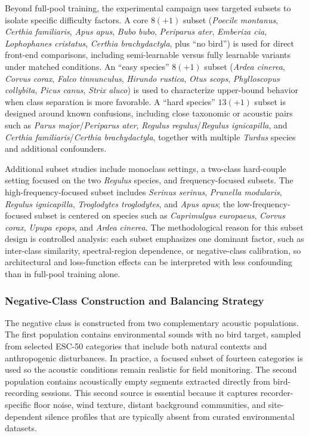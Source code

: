 \documentclass[a4paper,singleside,12pt]{report} %
\begin{document}
	Beyond full-pool training, the experimental campaign uses targeted subsets to isolate specific difficulty factors. A core \(8(+1)\) subset (\emph{Poecile montanus}, \emph{Certhia familiaris}, \emph{Apus apus}, \emph{Bubo bubo}, \emph{Periparus ater}, \emph{Emberiza cia}, \emph{Lophophanes cristatus}, \emph{Certhia brachydactyla}, plus ``no bird'') is used for direct front-end comparisons, including semi-learnable versus fully learnable variants under matched conditions. An ``easy species'' \(8(+1)\) subset (\emph{Ardea cinerea}, \emph{Corvus corax}, \emph{Falco tinnunculus}, \emph{Hirundo rustica}, \emph{Otus scops}, \emph{Phylloscopus collybita}, \emph{Picus canus}, \emph{Strix aluco}) is used to characterize upper-bound behavior when class separation is more favorable. A ``hard species'' \(13(+1)\) subset is designed around known confusions, including close taxonomic or acoustic pairs such as \emph{Parus major}/\emph{Periparus ater}, \emph{Regulus regulus}/\emph{Regulus ignicapilla}, and \emph{Certhia familiaris}/\emph{Certhia brachydactyla}, together with multiple \emph{Turdus} species and additional confounders.

	Additional subset studies include monoclass settings, a two-class hard-couple setting focused on the two \emph{Regulus} species, and frequency-focused subsets. The high-frequency-focused subset includes \emph{Serinus serinus}, \emph{Prunella modularis}, \emph{Regulus ignicapilla}, \emph{Troglodytes troglodytes}, and \emph{Apus apus}; the low-frequency-focused subset is centered on species such as \emph{Caprimulgus europaeus}, \emph{Corvus corax}, \emph{Upupa epops}, and \emph{Ardea cinerea}. The methodological reason for this subset design is controlled analysis: each subset emphasizes one dominant factor, such as inter-class similarity, spectral-region dependence, or negative-class calibration, so architectural and loss-function effects can be interpreted with less confounding than in full-pool training alone.

	\subsubsection{Negative-Class Construction and Balancing Strategy}
	The negative class is constructed from two complementary acoustic populations. The first population contains environmental sounds with no bird target, sampled from selected ESC-50 categories that include both natural contexts and anthropogenic disturbances. In practice, a focused subset of fourteen categories is used so the acoustic conditions remain realistic for field monitoring. The second population contains acoustically empty segments extracted directly from bird-recording sessions. This second source is essential because it captures recorder-specific floor noise, wind texture, distant background communities, and site-dependent silence profiles that are typically absent from curated environmental datasets.
\end{document}
